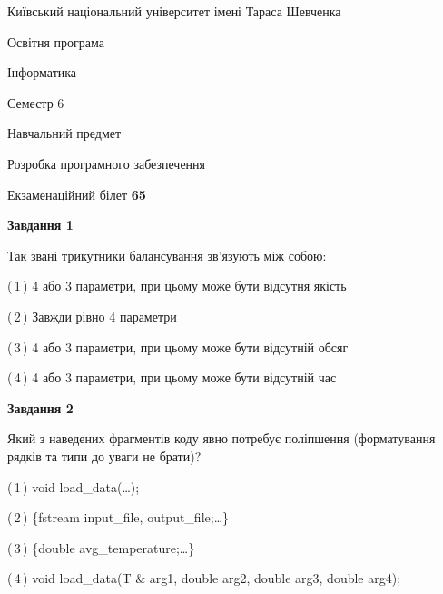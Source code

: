 \documentclass[10pt, ukrainian]{article}
\begin{document}
{{\begin {small}\par
{ \center  Київський національний університет імені Тараса Шевченка \par}
{\parbox {5 cm}{Освітня програма \hfill}{\parbox {7 cm}{Інформатика \hfill}}\parbox {6 cm}{\hfill Семестр 6}}\par
{\parbox {5 cm} {Навчальний предмет \hfill}\parbox {7 cm}{Розробка програмного забезпечення \hfill}\parbox {6cm}{\hfill}\par}\vspace{-7pt} \end{small}}{\center Екзаменаційний білет \No \textbf
{ 65 }\par}}
{
\begin {large}
{\begin {center}\textbf{Завдання 1}\end {center}}\par
Так звані трикутники балансування зв'язують між собою:\par
\vspace{2mm}



(\,1\,) 4 або 3 параметри, при цьому може бути відсутня якість%



(\,2\,) Завжди рівно 4 параметри%



(\,3\,) 4 або 3 параметри, при цьому може бути відсутній обсяг %



(\,4\,) 4 або 3 параметри, при цьому може бути відсутній час%


{\begin {center}\textbf{Завдання 2}\end {center}}\par
Який з наведених фрагментів коду явно потребує поліпшення (форматування рядків та типи до уваги не брати)?\par
\vspace{2mm}



(\,1\,) void load\_data(…);%



(\,2\,) \{fstream input\_file, output\_file;…\} %



(\,3\,) \{double avg\_temperature;…\} %



(\,4\,) void load\_data(T \& arg1, double arg2, double arg3, double arg4); %



\end{large}}
\end{document}
